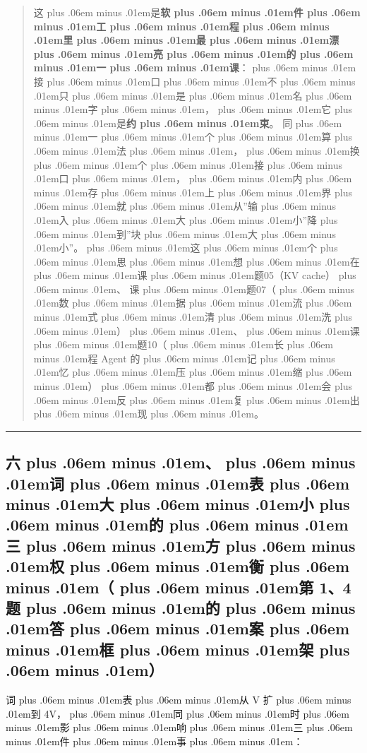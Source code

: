 \documentclass[
]{article}
\def\zh#1{{\zhfont #1}}
\def\zhglue{\hskip0pt plus .06em minus .01em}
\begin{document}
\begin{quote}
\zh{这\zhglue 是}\textbf{\zh{软\zhglue 件\zhglue 工\zhglue 程\zhglue 里\zhglue 最\zhglue 漂\zhglue 亮\zhglue 的\zhglue 一\zhglue 课}}\zh{：\zhglue 接\zhglue 口\zhglue 不\zhglue 只\zhglue 是\zhglue 名\zhglue 字\zhglue ，\zhglue 它\zhglue 是}\textbf{\zh{约\zhglue 束}}\zh{。} \zh{同\zhglue 一\zhglue 个\zhglue 算\zhglue 法\zhglue ，\zhglue 换\zhglue 个\zhglue 接\zhglue 口\zhglue ，\zhglue 内\zhglue 存\zhglue 上\zhglue 界\zhglue 就\zhglue 从}''\zh{输\zhglue 入\zhglue 大\zhglue 小}''\zh{降\zhglue 到}''\zh{块\zhglue 大\zhglue 小}''\zh{。\zhglue 这\zhglue 个\zhglue 思\zhglue 想\zhglue 在\zhglue 课\zhglue 题}05\zh{（}KV cache\zh{）\zhglue 、} \zh{课\zhglue 题}07\zh{（\zhglue 数\zhglue 据\zhglue 流\zhglue 式\zhglue 清\zhglue 洗\zhglue ）\zhglue 、\zhglue 课\zhglue 题}10\zh{（\zhglue 长\zhglue 程} Agent \zh{的\zhglue 记\zhglue 忆\zhglue 压\zhglue 缩\zhglue ）\zhglue 都\zhglue 会\zhglue 反\zhglue 复\zhglue 出\zhglue 现\zhglue 。}
\end{quote}

\begin{center}\rule{0.5\linewidth}{0.5pt}\end{center}

\subsection{\zh{六\zhglue 、\zhglue 词\zhglue 表\zhglue 大\zhglue 小\zhglue 的\zhglue 三\zhglue 方\zhglue 权\zhglue 衡\zhglue （\zhglue 第} 1\zh{、}4 \zh{题\zhglue 的\zhglue 答\zhglue 案\zhglue 框\zhglue 架\zhglue ）}}\label{ux516dux8bcdux8868ux5927ux5c0fux7684ux4e09ux65b9ux6743ux8861ux7b2c-14-ux9898ux7684ux7b54ux6848ux6846ux67b6}

\zh{词\zhglue 表\zhglue 从} V \zh{扩\zhglue 到} 4V\zh{，\zhglue 同\zhglue 时\zhglue 影\zhglue 响\zhglue 三\zhglue 件\zhglue 事\zhglue ：}
\end{document}
